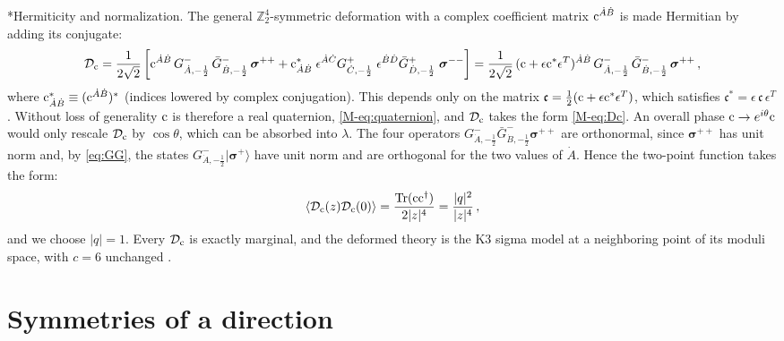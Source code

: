 \documentclass[aps,onecolumn,groupedaddress,nofootinbib,pra]{revtex4-2}
\makeatletter
\renewcommand\paragraph{\@startsection{paragraph}{4}{\parindent}{\z@}{-1em}{\normalfont\normalsize\bfseries}}
\newcommand{\Def}{\mathcal D}
\newcommand{\cMat}{{\rm c}}
\newcommand{\twist}{{\boldsymbol\sigma}}
\newcommand{\lam}{\lambda}
\newcommand{\Dc}{\Def_{\cMat}}
\DeclareMathOperator{\Tr}{Tr}
\makeatother
\begin{document}
\paragraph*{Hermiticity and normalization.}
The general $\mathbb Z_2^4$-symmetric deformation with a complex coefficient matrix $\cMat^{\dot A\dot B}$ is made Hermitian by adding its conjugate:
\begin{equation}
\label{eq:Dherm}
\Dc
 =\frac{1}{2\sqrt{2}} \left[ \cMat^{\dot A\dot B}\,G^{-}_{\dot A,-\frac12}\,\bar G^{-}_{\dot B,-\frac12}\,\twist^{++}  + \cMat^*_{\dot A\dot B}  \;\epsilon^{\dot A\dot C}G^{+}_{\dot C,-\frac12}\;\epsilon^{\dot B\dot D}\bar G^{+}_{\dot D,-\frac12} \;\twist^{--} \right]
 =\frac{1}{2\sqrt{2}} \,(\cMat+\epsilon \cMat^*\epsilon^T)^{\dot A \dot B}\,G^{-}_{\dot A,-\frac12}\,\bar G^{-}_{\dot B,-\frac12}\,\twist^{++}\,,
\end{equation}
where $\cMat^*_{\dot A\dot B} \equiv (\cMat^{\dot A \dot B})^*$ (indices lowered by complex conjugation). This depends only on the matrix $\mathfrak{c} = \frac12(\cMat+\epsilon \cMat^*\epsilon^T)$, which satisfies $\mathfrak{c} ^*=\epsilon\, \mathfrak{c} \,\epsilon^T$. Without loss of generality $\cMat$ is therefore a real quaternion, \eqref{M-eq:quaternion}, and $\Dc$ takes the form \eqref{M-eq:Dc}. An overall phase $\cMat\to e^{ i \theta}\cMat$ would only rescale $\Dc$ by $\cos\theta$, which can be absorbed into $\lam$. The four operators $G^{-}_{\dot A,-\frac12}\bar G^{-}_{\dot B,-\frac12}\twist^{++}$ are orthonormal, since $\twist^{++}$ has unit norm and, by \eqref{eq:GG}, the states $G^{-}_{\dot A,-\frac12}|\twist^{+}\rangle$ have unit norm and are orthogonal for the two values of $\dot A$. Hence the two-point function takes the form:
\begin{equation}
\label{eq:norm}
\langle\Dc(z)\Dc(0)\rangle=\frac{\Tr (\cMat \cMat^\dagger)}{2|z|^{4}}=\frac{|q|^2}{|z|^{4}}\,,
\end{equation}
and we choose $|q|=1$. Every $\Dc$ is exactly marginal, and the deformed theory is the K3 sigma model at a neighboring point of its moduli space, with $c=6$ unchanged \cite{Seiberg:1999xz}.


\section{Symmetries of a direction}
\label{app:symmetries}
\end{document}

